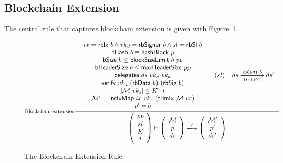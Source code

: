 \documentclass[11pt,a4paper]{article}
\newcommand{\var}[1]{\mathit{#1}}
\newcommand{\fun}[1]{\mathsf{#1}}
\newcommand{\size}[1]{\left| #1 \right|}
\newcommand{\trans}[2]{\xlongrightarrow[\textsc{#1}]{#2}}
\newcommand{\hashname}{bHash}
\newcommand{\bsizename}{bSize}
\newcommand{\bhdrsizename}{bHeaderSize}
\newcommand{\verifyname}{verify}
\newcommand{\delegationname}{delegates} %
\newcommand{\signmapname}{\mathcal{M}}
\newcommand{\trimixname}{trimIx}
\newcommand{\incixmapname}{incIxMap}
\newcommand{\hashofblockname}{hashBlock}
\newcommand{\blocksizelimitname}{blockSizeLimit}
\newcommand{\maxheadersizename}{maxHeaderSize}
\newcommand{\rbdataname}{rbData}
\newcommand{\rbcertsname}{rbCerts}
\newcommand{\rbsigname}{rbSig}
\newcommand{\rbixname}{rbIx}
\newcommand{\rbslname}{rbSl}
\newcommand{\rbsignername}{rbSigner}
\newcommand{\verify}[3]{\fun{\verifyname} ~ #1 ~ #2 ~ #3}
\newcommand{\hash}[1]{\fun{\hashname}\ #1}
\newcommand{\bsize}[1]{\fun{\bsizename} ~ #1}
\newcommand{\bhdrsize}[1]{\fun{\bhdrsizename} ~ #1}
\newcommand{\delegation}[3]{\fun{\delegationname} ~ #1 ~ #2 ~#3}
\newcommand{\signmap}[1]{\fun{\signmapname} ~ #1}
\newcommand{\trimix}[2]{\fun{\trimixname} ~ #1 ~ #2}
\newcommand{\incixmap}[3]{\fun{\incixmapname} ~ #1 ~ #2 ~ #3}
\newcommand{\hashofblock}[1]{\fun{\hashofblockname} ~ #1}
\newcommand{\blocksizelimit}[2]{\fun{\blocksizelimitname} ~ #1 ~ #2}
\newcommand{\maxheadersize}[1]{\fun{\maxheadersizename} ~ #1}
\newcommand{\rbdata}[1]{\fun{\rbdataname} ~ #1}
\newcommand{\rbcerts}[1]{\fun{\rbcertsname} ~ #1}
\newcommand{\rbsig}[1]{\fun{\rbsigname} ~ #1}
\newcommand{\rbix}[1]{\fun{\rbixname} ~ #1}
\newcommand{\rbsl}[1]{\fun{\rbslname} ~ #1}
\newcommand{\rbsigner}[1]{\fun{\rbsignername} ~ #1}
\begin{document}
\subsection{Blockchain Extension}
\label{sec:chain-extension}

The central rule that captures blockchain extension is given with
Figure~\ref{fig:blockchain-extension}.

\begin{figure}
  \begin{equation*}
  \inference[Blockchain-extension]
  {
    {\begin{array}{c}
      ix = \rbix{b} \wedge vk_d = \rbsigner{b} \wedge sl = \rbsl{b} \\
      \hash{b} \equiv \hashofblock{p} \\
      \bsize{b} \leq \blocksizelimit{b}{\var{pp}} \\
      \bhdrsize{b} \leq \maxheadersize{\var{pp}} \\
      \delegation{ds}{vk_s}{vk_d} \\
      \verify{vk_d}{(\rbdata{b})}{(\rbsig{b})} \\
      \size{\signmap{vk_s}} \leq K \cdot t \\
      \signmapname' = \incixmap{ix}{vk_s}{(\trimix{\signmapname}{ix})} \\
      p' = b 
     \end{array}}
   & (sl) \vdash ds \trans{\text{DELEG}}{\rbcerts{b}} ds'
  }
  {
    \left(
      {\begin{array}{c}
         pp \\
         sl \\
         K \\
         t
       \end{array}}
    \right)
    \vdash
    \left(
      {\begin{array}{c}
         \signmapname \\
         p \\
         ds
       \end{array}}
    \right)
    \trans{}{b}
    \left(
      {\begin{array}{c}
         \signmapname' \\
         p' \\
         ds'
       \end{array}}
    \right)
 }
  \end{equation*}
  \caption{The Blockchain Extension Rule}
  \label{fig:blockchain-extension}
\end{figure}
\end{document}
